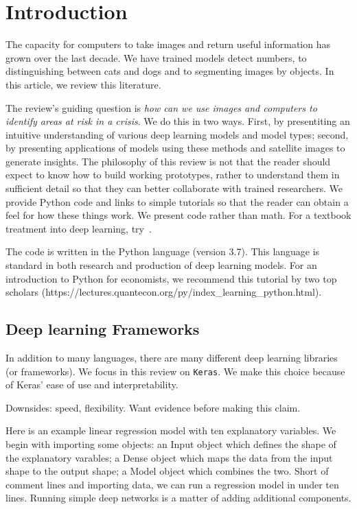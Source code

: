 \documentclass[12pt, a4paper, oneside, headinclude, footinclude]{article}
\begin{document}
\section{Introduction}

The capacity for computers to take images and return useful information has
grown over the last decade. We have trained models detect numbers, to
distinguishing between cats and dogs and to segmenting images by objects. In
this article, we review this literature.

The review's guiding question is \textit{how can we use
images and computers to identify areas at risk in a crisis}. We do this in
two ways. First, by presentiting an intuitive understanding of various deep
learning models and model types; second, by presenting applications of models
using these methods and satellite images to generate insights. The philosophy
of this review is not that the reader should expect to know how to build
working prototypes, rather to understand them in sufficient detail so that
they can better collaborate with trained researchers. We provide Python code and
links to simple tutorials so that the reader can obtain a feel for how these
things work. We present code rather than math. For a textbook treatment into
deep learning, try~\cite{lecun2015deep}.

The code is written in the Python language (version 3.7). This language is
standard in both research and production of deep learning models. For an
introduction to Python for economists, we recommend this tutorial by two
top scholars
(https://lectures.quantecon.org/py/index_learning_python.html).


\subsection{Deep learning Frameworks}

In addition to many languages, there are many different deep learning
libraries (or frameworks). We focus in this review on \texttt{Keras}. We
make this choice because of Keras' ease of use and interpretability. 

Downsides: speed, flexibility. Want evidence before making this claim. 

Here is an example linear regression model with ten explanatory variables.
We begin with importing some objects: an Input object which defines the shape
of the explanatory varables; a Dense object which maps the data from the input
shape to the output shape; a Model object which combines the two. Short of
comment lines and importing data, we can run a regression model in under ten
lines. Running simple deep networks is a matter of adding additional
components.
\end{document}
